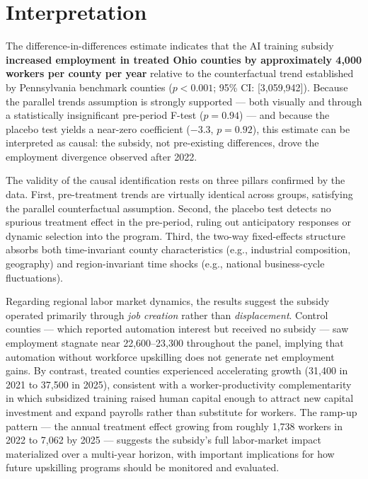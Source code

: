 \documentclass[12pt]{article}
\begin{document}
\section*{Interpretation}

The difference-in-differences estimate indicates that the AI training
subsidy \textbf{increased employment in treated Ohio counties by
approximately 4{,}000 workers per county per year} relative to the
counterfactual trend established by Pennsylvania benchmark counties
($p < 0.001$; 95\% CI: [3{,}059,942]).  Because the parallel
trends assumption is strongly supported --- both visually and through
a statistically insignificant pre-period F-test ($p = 0.94$) --- and
because the placebo test yields a near-zero coefficient ($-3.3$,
$p = 0.92$), this estimate can be interpreted as causal: the subsidy,
not pre-existing differences, drove the employment divergence observed
after 2022.

The validity of the causal identification rests on three pillars
confirmed by the data.  First, pre-treatment trends are virtually
identical across groups, satisfying the parallel counterfactual
assumption.  Second, the placebo test detects no spurious treatment
effect in the pre-period, ruling out anticipatory responses or dynamic
selection into the program.  Third, the two-way fixed-effects structure
absorbs both time-invariant county characteristics (e.g., industrial
composition, geography) and region-invariant time shocks (e.g.,
national business-cycle fluctuations).

Regarding regional labor market dynamics, the results suggest the
subsidy operated primarily through \emph{job creation} rather than
\emph{displacement}.  Control counties --- which reported automation
interest but received no subsidy --- saw employment stagnate near
22{,}600--23{,}300 throughout the panel, implying that automation
without workforce upskilling does not generate net employment gains.
By contrast, treated counties experienced accelerating growth (31{,}400
in 2021 to 37{,}500 in 2025), consistent with a worker-productivity
complementarity in which subsidized training raised human capital
enough to attract new capital investment and expand payrolls rather than
substitute for workers.  The ramp-up pattern --- the annual treatment
effect growing from roughly 1{,}738 workers in 2022 to 7{,}062 by 2025
--- suggests the subsidy's full labor-market impact materialized over a
multi-year horizon, with important implications for how future upskilling
programs should be monitored and evaluated.
\end{document}

